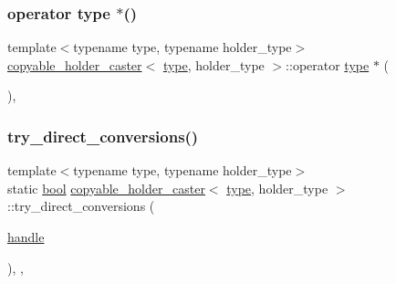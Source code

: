 \subsubsection{\texorpdfstring{operator type $\ast$()}{operator type *()}}
{\footnotesize\ttfamily template$<$typename type, typename holder\+\_\+type$>$ \\
\mbox{\hyperlink{structcopyable__holder__caster}{copyable\+\_\+holder\+\_\+caster}}$<$ \mbox{\hyperlink{_s_d_l__opengl_8h_ad5ddf6fca7b585646515660e810e0188}{type}}, holder\+\_\+type $>$\+::operator \mbox{\hyperlink{_s_d_l__opengl_8h_ad5ddf6fca7b585646515660e810e0188}{type}} $\ast$ (\begin{DoxyParamCaption}{ }\end{DoxyParamCaption})\hspace{0.3cm}{\ttfamily [inline]}, {\ttfamily [explicit]}}

\mbox{\label{structcopyable__holder__caster_af1b6fc22fdfe27e062af0ee7f74ccd54}} 
\subsubsection{\texorpdfstring{try\_direct\_conversions()}{try\_direct\_conversions()}}
{\footnotesize\ttfamily template$<$typename type, typename holder\+\_\+type$>$ \\
static \mbox{\hyperlink{asdl_8h_af6a258d8f3ee5206d682d799316314b1}{bool}} \mbox{\hyperlink{structcopyable__holder__caster}{copyable\+\_\+holder\+\_\+caster}}$<$ \mbox{\hyperlink{_s_d_l__opengl_8h_ad5ddf6fca7b585646515660e810e0188}{type}}, holder\+\_\+type $>$\+::try\+\_\+direct\+\_\+conversions (\begin{DoxyParamCaption}\item[{\mbox{\hyperlink{classhandle}{handle}}}]{ }\end{DoxyParamCaption})\hspace{0.3cm}{\ttfamily [inline]}, {\ttfamily [static]}, {\ttfamily [protected]}}

\mbox{\label{structcopyable__holder__caster_a3bcddc9789c2710905270b7888b36a46}} 
